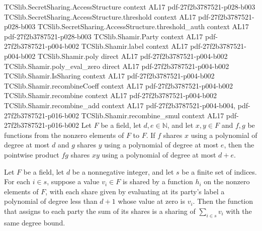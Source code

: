 \begin{theorem}
\label{TCSlib.Shamir.IsSharing.mul}
\leanok
\proofstep
  {TCSlib.SecretSharing.AccessStructure}
  {context}
  {AL17}
  {pdf-27f2b3787521-p028-b003}
\proofstep
  {TCSlib.SecretSharing.AccessStructure.threshold}
  {context}
  {AL17}
  {pdf-27f2b3787521-p028-b003}
\proofstep
  {TCSlib.SecretSharing.AccessStructure.threshold_auth}
  {context}
  {AL17}
  {pdf-27f2b3787521-p028-b003}
\proofstep
  {TCSlib.Shamir.Party}
  {context}
  {AL17}
  {pdf-27f2b3787521-p004-b002}
\proofstep
  {TCSlib.Shamir.label}
  {context}
  {AL17}
  {pdf-27f2b3787521-p004-b002}
\proofstep
  {TCSlib.Shamir.poly}
  {direct}
  {AL17}
  {pdf-27f2b3787521-p004-b002}
\proofstep
  {TCSlib.Shamir.poly_eval_zero}
  {direct}
  {AL17}
  {pdf-27f2b3787521-p004-b002}
\proofstep
  {TCSlib.Shamir.IsSharing}
  {context}
  {AL17}
  {pdf-27f2b3787521-p004-b002}
\proofstep
  {TCSlib.Shamir.recombineCoeff}
  {context}
  {AL17}
  {pdf-27f2b3787521-p004-b002}
\proofstep
  {TCSlib.Shamir.recombine}
  {context}
  {AL17}
  {pdf-27f2b3787521-p004-b002}
\proofstep
  {TCSlib.Shamir.recombine_add}
  {context}
  {AL17}
  {pdf-27f2b3787521-p004-b004,
    pdf-27f2b3787521-p016-b002}
\proofstep
  {TCSlib.Shamir.recombine_smul}
  {context}
  {AL17}
  {pdf-27f2b3787521-p016-b002}
Let $F$ be a field, let $d,e\in\mathbb N$, and let $x,y\in F$ and $f,g$ be functions
from the nonzero elements of $F$ to $F$. If $f$ shares $x$ using a polynomial of degree
at most $d$ and $g$ shares $y$ using a polynomial of degree at most $e$, then the
pointwise product $fg$ shares $xy$ using a polynomial of degree at most $d+e$.
\end{theorem}

\begin{theorem}
\label{TCSlib.Shamir.IsSharing.sum}
\leanok
{}
Let $F$ be a field, let $d$ be a nonnegative integer, and let $s$ be a finite set of
indices. For each $i\in s$, suppose a value $v_i\in F$ is shared by a function $h_i$ on
the nonzero elements of $F$, with each share given by evaluating at its party's label a
polynomial of degree less than $d+1$ whose value at zero is $v_i$. Then the function
that assigns to each party the sum of its shares is a sharing of $\sum_{i\in s}v_i$ with
the same degree bound.
\end{theorem}

